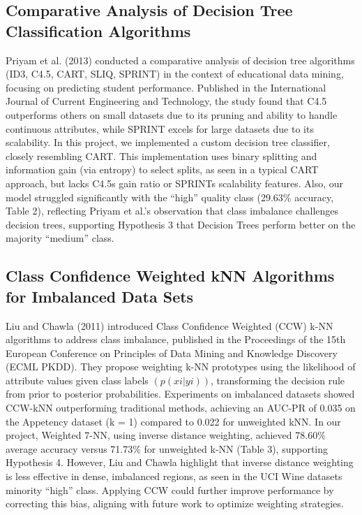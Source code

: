 \documentclass{article}
\theoremstyle{plain}
\theoremstyle{definition}
\theoremstyle{remark}
\begin{document}
\subsection{Comparative Analysis of Decision Tree Classification Algorithms}

Priyam et al. (2013) conducted a comparative analysis of decision tree algorithms (ID3, C4.5, CART, SLIQ, SPRINT) in the context of educational data
mining, focusing on predicting student performance. Published in the International Journal of Current Engineering and Technology, the study found
that C4.5 outperforms others on small datasets due to its pruning and ability to
handle continuous attributes, while SPRINT excels for large datasets due to its
scalability. In this project, we implemented a custom decision tree classifier, closely resembling CART. This implementation uses binary splitting and information gain (via entropy) to select splits, as seen in a typical CART approach, but lacks C4.5s gain ratio
or SPRINTs scalability features. Also, our model struggled significantly with the “high” quality class (29.63\% accuracy, Table 2), reflecting Priyam et al.’s observation that class imbalance challenges decision trees, supporting Hypothesis 3 that Decision Trees perform better on the majority “medium” class.

\subsection{Class Confidence Weighted
kNN Algorithms for Imbalanced Data Sets}

Liu and Chawla (2011) introduced Class Confidence Weighted (CCW) k-NN algorithms to address class imbalance, published in the Proceedings of the 15th
European Conference on Principles of Data Mining and Knowledge Discovery (ECML PKDD). They propose weighting k-NN prototypes using the likelihood of attribute values given class labels $(p(xi|yi))$, transforming the decision rule from prior to posterior probabilities. Experiments on imbalanced datasets showed CCW-kNN outperforming traditional methods, achieving an AUC-PR
of 0.035 on the Appetency dataset (k = 1) compared to 0.022 for unweighted kNN. In our project, Weighted 7-NN, using inverse distance weighting, achieved
78.60\% average accuracy versus 71.73\% for unweighted k-NN (Table 3), supporting Hypothesis 4. However, Liu and Chawla highlight that inverse distance weighting is less effective in dense, imbalanced regions, as seen in the UCI Wine datasets minority “high” class. Applying CCW could further improve performance by correcting this bias, aligning with future work to optimize weighting
strategies.
\end{document}

